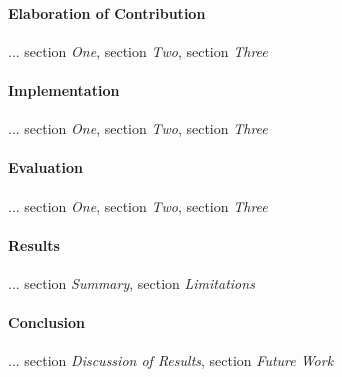 \paragraph{Elaboration of Contribution} ... section \textit{One}, section \textit{Two}, section \textit{Three}

\paragraph{Implementation} ... section \textit{One}, section \textit{Two}, section \textit{Three}

\paragraph{Evaluation} ... section \textit{One}, section \textit{Two}, section \textit{Three}

\paragraph{Results} ... section \textit{Summary}, section \textit{Limitations}

\paragraph{Conclusion} ... section \textit{Discussion of Results}, section \textit{Future Work}